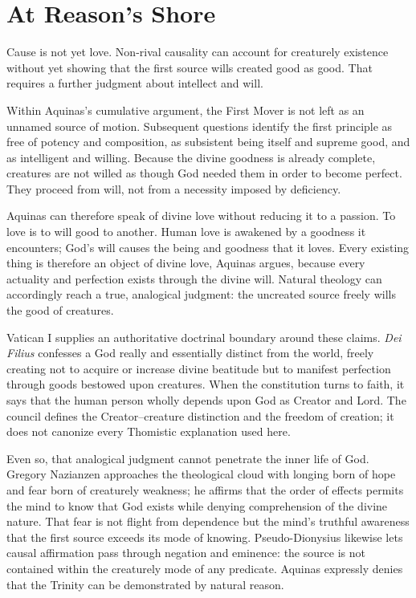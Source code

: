 \section{At Reason's Shore}

Cause is not yet love. Non-rival causality can account for creaturely existence without yet showing that the first source wills created good as good. That requires a further judgment about intellect and will.

Within Aquinas's cumulative argument, the First Mover is not left as an unnamed source of motion. Subsequent questions identify the first principle as free of potency and composition, as subsistent being itself and supreme good, and as intelligent and willing. Because the divine goodness is already complete, creatures are not willed as though God needed them in order to become perfect. They proceed from will, not from a necessity imposed by deficiency.

Aquinas can therefore speak of divine love without reducing it to a passion. To love is to will good to another. Human love is awakened by a goodness it encounters; God's will causes the being and goodness that it loves. Every existing thing is therefore an object of divine love, Aquinas argues, because every actuality and perfection exists through the divine will. Natural theology can accordingly reach a true, analogical judgment: the uncreated source freely wills the good of creatures.

Vatican I supplies an authoritative doctrinal boundary around these claims. \emph{Dei Filius} confesses a God really and essentially distinct from the world, freely creating not to acquire or increase divine beatitude but to manifest perfection through goods bestowed upon creatures. When the constitution turns to faith, it says that the human person wholly depends upon God as Creator and Lord. The council defines the Creator--creature distinction and the freedom of creation; it does not canonize every Thomistic explanation used here.

Even so, that analogical judgment cannot penetrate the inner life of God. Gregory Nazianzen approaches the theological cloud with longing born of hope and fear born of creaturely weakness; he affirms that the order of effects permits the mind to know that God exists while denying comprehension of the divine nature. That fear is not flight from dependence but the mind's truthful awareness that the first source exceeds its mode of knowing. Pseudo-Dionysius likewise lets causal affirmation pass through negation and eminence: the source is not contained within the creaturely mode of any predicate. Aquinas expressly denies that the Trinity can be demonstrated by natural reason.

